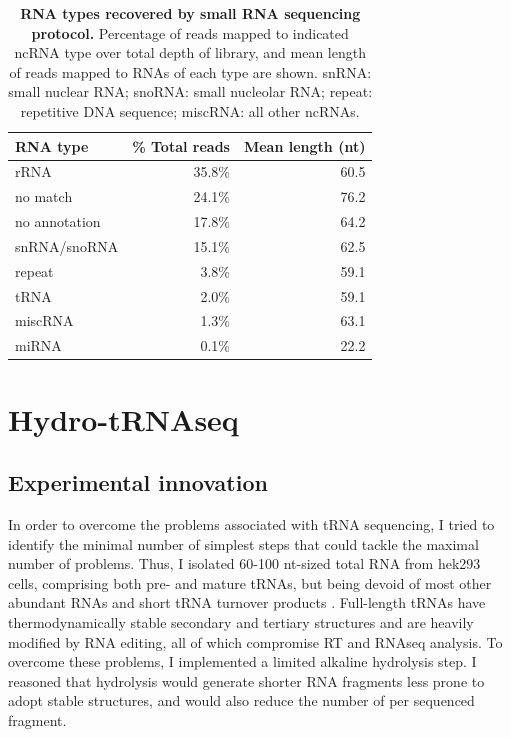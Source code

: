 \documentclass[12pt]{rockefeller}
\begin{document}
\begin{table}[!ht]
\begin{center}
\tabulinesep=1.2mm
\begin{tabu}{ | l | r | r |}
	\hline
    RNA type & \% Total reads & Mean length (nt) \\ \hline
	rRNA & 35.8\% & 60.5 \\ \hline
	no match  & 24.1\% & 76.2 \\ \hline
	no annotation & 17.8\% & 64.2 \\ \hline
	snRNA/snoRNA & 15.1\% & 62.5 \\ \hline
	repeat & 3.8\% & 59.1 \\ \hline
	tRNA & 2.0\% & 59.1 \\ \hline
	miscRNA & 1.3\% & 63.1 \\ \hline
	miRNA & 0.1\% & 22.2 \\
	\hline
\end{tabu}
\end{center}
\caption[RNA types recovered by small RNA sequencing protocol]{\textbf{RNA types recovered by small RNA sequencing protocol.} Percentage of reads mapped to indicated ncRNA type over total depth of library, and mean length of reads mapped to RNAs of each type are shown. snRNA: small nuclear RNA; snoRNA: small nucleolar RNA; repeat: repetitive DNA sequence; miscRNA: all other ncRNAs.	}\label{abysmal}
\end{table}

\chapter{Hydro-tRNAseq}

\section{Experimental innovation}
In order to overcome the problems associated with tRNA sequencing, I tried to identify the minimal number of simplest steps that could tackle the maximal number of problems. Thus, I isolated 60-100 nt-sized total RNA from \gls{hek293} cells, comprising both pre- and mature tRNAs, but being devoid of most other abundant RNAs and short tRNA turnover products \cite{Lee:2009fb}. Full-length tRNAs have thermodynamically stable secondary and tertiary structures and are heavily modified by RNA editing, all of which compromise RT and RNAseq analysis. To overcome these problems, I implemented a limited alkaline hydrolysis step. I reasoned that hydrolysis would generate shorter RNA fragments less prone to adopt stable structures, and would also reduce the number of per sequenced fragment. 
\end{document}
